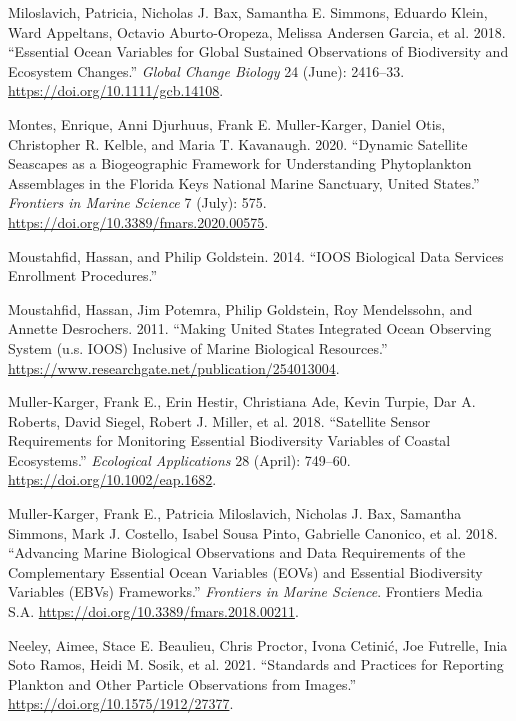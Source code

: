 \documentclass[
]{book}
\newlength{\cslhangindent}
\newlength{\cslentryspacingunit} %
\newenvironment{CSLReferences}[2] %
 {%
  \setlength{\parindent}{0pt}
  \ifodd #1
  \let\oldpar\par
  \def\par{\hangindent=\cslhangindent\oldpar}
  \fi
  \setlength{\parskip}{#2\cslentryspacingunit}
 }%
 {}
\begin{document}
\begin{CSLReferences}{1}{0}
\leavevmode{}%
Miloslavich, Patricia, Nicholas J. Bax, Samantha E. Simmons, Eduardo Klein, Ward Appeltans, Octavio Aburto-Oropeza, Melissa Andersen Garcia, et al. 2018. {``Essential Ocean Variables for Global Sustained Observations of Biodiversity and Ecosystem Changes.''} \emph{Global Change Biology} 24 (June): 2416--33. \url{https://doi.org/10.1111/gcb.14108}.

\leavevmode{}%
Montes, Enrique, Anni Djurhuus, Frank E. Muller-Karger, Daniel Otis, Christopher R. Kelble, and Maria T. Kavanaugh. 2020. {``Dynamic Satellite Seascapes as a Biogeographic Framework for Understanding Phytoplankton Assemblages in the Florida Keys National Marine Sanctuary, United States.''} \emph{Frontiers in Marine Science} 7 (July): 575. \url{https://doi.org/10.3389/fmars.2020.00575}.

\leavevmode{}%
Moustahfid, Hassan, and Philip Goldstein. 2014. {``IOOS Biological Data Services Enrollment Procedures.''}

\leavevmode{}%
Moustahfid, Hassan, Jim Potemra, Philip Goldstein, Roy Mendelssohn, and Annette Desrochers. 2011. {``Making United States Integrated Ocean Observing System (u.s. IOOS) Inclusive of Marine Biological Resources.''} \url{https://www.researchgate.net/publication/254013004}.

\leavevmode{}%
Muller-Karger, Frank E., Erin Hestir, Christiana Ade, Kevin Turpie, Dar A. Roberts, David Siegel, Robert J. Miller, et al. 2018. {``Satellite Sensor Requirements for Monitoring Essential Biodiversity Variables of Coastal Ecosystems.''} \emph{Ecological Applications} 28 (April): 749--60. \url{https://doi.org/10.1002/eap.1682}.

\leavevmode{}%
Muller-Karger, Frank E., Patricia Miloslavich, Nicholas J. Bax, Samantha Simmons, Mark J. Costello, Isabel Sousa Pinto, Gabrielle Canonico, et al. 2018. {``Advancing Marine Biological Observations and Data Requirements of the Complementary Essential Ocean Variables (EOVs) and Essential Biodiversity Variables (EBVs) Frameworks.''} \emph{Frontiers in Marine Science}. Frontiers Media S.A. \url{https://doi.org/10.3389/fmars.2018.00211}.

\leavevmode{}%
Neeley, Aimee, Stace E. Beaulieu, Chris Proctor, Ivona Cetinić, Joe Futrelle, Inia Soto Ramos, Heidi M. Sosik, et al. 2021. {``Standards and Practices for Reporting Plankton and Other Particle Observations from Images.''} \url{https://doi.org/10.1575/1912/27377}.


\end{CSLReferences}
\end{document}
